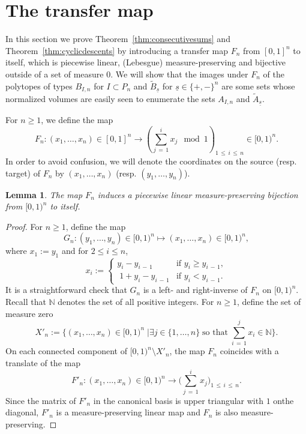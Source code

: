 \documentclass[11pt]{article}
\newtheorem{lemm}[theo]{Lemma}
\theoremstyle{definition}
\numberwithin{equation}{section}
\numberwithin{figure}{section}
\numberwithin{table}{section}
\newcommand{\N}{\mathbb N}
\let\oldexists\exists
\renewcommand*{\exists}{\mathrel{\oldexists}}
\begin{document}
\section{The transfer map}\label{sec:transfermap}

In this section we prove Theorem~\ref{thm:consecutivesums} and Theorem~\ref{thm:cyclicdescents} by introducing a transfer map $F_n$ from $[0,1]^n$ to itself, which is piecewise linear, (Lebesgue) measure-preserving and bijective outside of a set of measure $0$. We will show that the images under $F_n$ of the polytopes of types $B_{I,n}$ for $I\subset P_{n}$ and $\widetilde{B}_{\underline{s}}$ for $\underline{s}\in \{+,-\}^n$ are some sets whose normalized volumes are easily seen to enumerate the sets $A_{I,n}$ and $\widetilde{A}_{\underline{s}}$.

For $n\geq1$, we define the map
\[
F_n:(x_1,\ldots,x_n)\in[0,1]^n \rightarrow \left(\sum_{j\,=\,1}^i x_j \mod 1 \right)_{\!1\,\leq\,i\,\leq\,n}\!\in [0,1)^n.
\]
In order to avoid confusion, we will denote the coordinates on the source (resp. target) of $F_n$ by $(x_1,\ldots,x_n)$ (resp. $(y_1,\ldots,y_n)$).

\begin{lemm}\label{lem:measurepreserving}
The map $F_n$ induces a piecewise linear measure-preserving bijection from $[0,1)^n$ to itself.
\end{lemm}

\begin{proof}
For $n\geq1$, define the map
\[
G_n:(y_1,\ldots,y_n)\in[0,1)^n \mapsto (x_1,\ldots,x_n) \in [0,1)^n,
\]
where $x_1:=y_1$ and for $2 \leq i \leq n$,
\[
x_i:=
\begin{cases}
y_i-y_{i\,-\,1} &\text{if } y_i \geq y_{i\,-\,1}, \\
\;1+ y_i-y_{i\,-\,1} &\text{if } y_i < y_{i\,-\,1}.
\end{cases}
\]
It is a straightforward check that $G_n$ is a left- and right-inverse of $F_n$ on $[0,1)^n$. Recall that $\N$ denotes the set of all positive integers. For $n\geq 1$, define the set of measure zero
\[
X'_n:=\bigg\{(x_1,\ldots,x_n)\in[0,1)^n \; {\bigg |} \exists j \in\{1,\ldots,n\} \; \text{so that} \; \sum_{i\,=\,1}^j x_i \in \N \bigg\}.
\]
On each connected component of $[0,1)^n \setminus X'_n$, the map $F_n$ coincides with a translate of the map
\[
F'_n:(x_1,\ldots,x_n)\in[0,1)^n \rightarrow \Bigg(\sum_{j\,=\,1}^i x_j \Bigg)_{1\,\leq\,i\,\leq\,n}.
\]
Since the matrix of $F'_n$ in the canonical basis is upper triangular with $1$ on\linebreak the diagonal, $F'_n$ is a measure-preserving linear map and $F_n$ is also measure-\linebreak preserving.
\end{proof}
\end{document}
